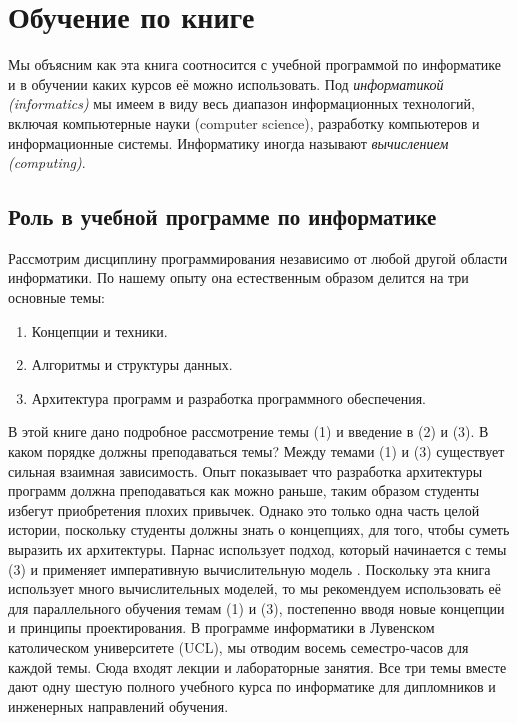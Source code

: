 \section*{Обучение по книге}

Мы объясним как эта книга соотносится с учебной программой по информатике и в обучении каких курсов её можно использовать. Под \emph{информатикой (informatics)} мы имеем в виду весь диапазон информационных технологий, включая компьютерные науки (computer science), разработку компьютеров и информационные системы. Информатику иногда называют \emph{вычислением (computing)}.

\subsection*{Роль в учебной программе по информатике}

Рассмотрим дисциплину программирования независимо от любой другой области информатики. По нашему опыту она естественным образом делится на три основные темы: 

\begin{enumerate}
\item{Концепции и техники.}

\item{Алгоритмы и структуры данных.}

\item{Архитектура программ и разработка программного обеспечения.}
\end{enumerate}

В этой книге дано подробное рассмотрение темы (1) и введение в (2) и (3). В каком порядке должны преподаваться темы? Между темами (1) и (3) существует сильная взаимная зависимость. Опыт показывает что разработка архитектуры программ должна преподаваться как можно раньше, таким образом студенты избегут приобретения плохих привычек. Однако это только одна часть целой истории, поскольку студенты должны знать о концепциях, для того, чтобы суметь выразить их архитектуры. Парнас использует подход, который начинается с темы (3) и применяет императивную вычислительную модель \cite{143}. Поскольку эта книга использует много вычислительных моделей, то мы рекомендуем использовать её для параллельного обучения темам (1) и (3), постепенно вводя новые концепции и принципы проектирования. В программе информатики в Лувенском католическом университете (UCL), мы отводим восемь семестро-часов для каждой темы. Сюда входят лекции и лабораторные занятия. Все три темы вместе дают одну шестую полного учебного курса по информатике для дипломников и инженерных направлений обучения.


